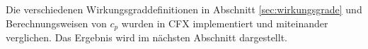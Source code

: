 Die verschiedenen Wirkungsgraddefinitionen in Abschnitt \ref{sec:wirkungsgrade} und Berechnungsweisen von $c_p$ wurden in CFX implementiert und miteinander verglichen. Das Ergebnis  wird im nächsten Abschnitt dargestellt.

\begin{comment}
\section{Wirkungsgrade bei der Aachen-Turbine}
\label{sec:wgaachen}
Bei der Aachen-Turbine ergaben sich je nach Berechnungsart folgende Werte für den Wirkungsgrad:
\begin{table}[H]
\centering
\caption{Wirkungsgrad bei der Aachen-Turbine}
\begin{tabular}{ c| c}
Berechnungsformel & $\eta$ \\
\hline
$\eta_{\Delta T_t}$ mit $c_p$ konstant& 86\% \\
$\eta_{\Delta T_t}$ mit $c_p(T)$& 86\% \\
$\eta_{\Delta h_t}$& 87\% \\
$\eta_{torque}$& 85\% \\
\end{tabular}
\label{tab:wgaachen}
\end{table}
Es ist zu sehen, dass .....
\todo
\end{comment}






